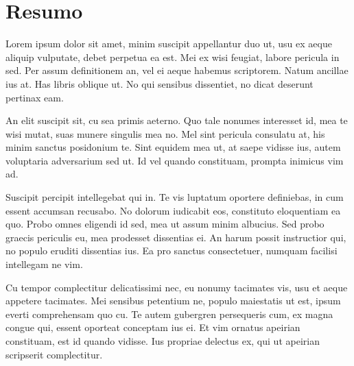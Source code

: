 \chapter*{Resumo}
\justify

Lorem ipsum dolor sit amet, minim suscipit appellantur duo ut, usu ex aeque aliquip vulputate, debet perpetua ea est. Mei ex wisi feugiat, labore pericula in sed. Per assum definitionem an, vel ei aeque habemus scriptorem. Natum ancillae ius at. Has libris oblique ut. No qui sensibus dissentiet, no dicat deserunt pertinax eam.

An elit suscipit sit, cu sea primis aeterno. Quo tale nonumes interesset id, mea te wisi mutat, suas munere singulis mea no. Mel sint pericula consulatu at, his minim sanctus posidonium te. Sint equidem mea ut, at saepe vidisse ius, autem voluptaria adversarium sed ut. Id vel quando constituam, prompta inimicus vim ad.

Suscipit percipit intellegebat qui in. Te vis luptatum oportere definiebas, in cum essent accumsan recusabo. No dolorum iudicabit eos, constituto eloquentiam ea quo. Probo omnes eligendi id sed, mea ut assum minim albucius. Sed probo graecis periculis eu, mea prodesset dissentias ei. An harum possit instructior qui, no populo eruditi dissentias ius. Ea pro sanctus consectetuer, numquam facilisi intellegam ne vim.

Cu tempor complectitur delicatissimi nec, eu nonumy tacimates vis, usu et aeque appetere tacimates. Mei sensibus petentium ne, populo maiestatis ut est, ipsum everti comprehensam quo cu. Te autem gubergren persequeris cum, ex magna congue qui, essent oporteat conceptam ius ei. Et vim ornatus apeirian constituam, est id quando vidisse. Ius propriae delectus ex, qui ut apeirian scripserit complectitur.

